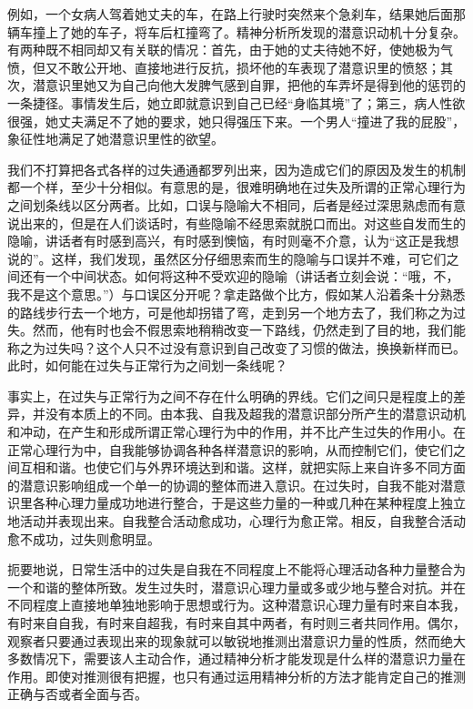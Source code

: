 \documentclass[UTF8,10pt,a4paper,openany]{book}
\begin{document}
例如，一个女病人驾着她丈夫的车，在路上行驶时突然来个急刹车，结果她后面那辆车撞上了她的车子，将车后杠撞弯了。精神分析所发现的潜意识动机十分复杂。有两种既不相同却又有关联的情况：首先，由于她的丈夫待她不好，使她极为气愤，但又不敢公开地、直接地进行反抗，损坏他的车表现了潜意识里的愤怒；其次，潜意识里她又为自己向他大发脾气感到自罪，把他的车弄坏是得到他的惩罚的一条捷径。事情发生后，她立即就意识到自己已经“身临其境”了；第三，病人性欲很强，她丈夫满足不了她的要求，她只得强压下来。一个男人“撞进了我的屁股”，象征性地满足了她潜意识里性的欲望。

我们不打算把各式各样的过失通通都罗列出来，因为造成它们的原因及发生的机制都一个样，至少十分相似。有意思的是，很难明确地在过失及所谓的正常心理行为之间划条线以区分两者。比如，口误与隐喻大不相同，后者是经过深思熟虑而有意说出来的，但是在人们谈话时，有些隐喻不经思索就脱口而出。对这些自发而生的隐喻，讲话者有时感到高兴，有时感到懊恼，有时则毫不介意，认为“这正是我想说的”。这样，我们发现，虽然区分仔细思索而生的隐喻与口误并不难，可它们之间还有一个中间状态。如何将这种不受欢迎的隐喻（讲话者立刻会说：“哦，不，我不是这个意思。”）与口误区分开呢？拿走路做个比方，假如某人沿着条十分熟悉的路线步行去一个地方，可是他却拐错了弯，走到另一个地方去了，我们称之为过失。然而，他有时也会不假思索地稍稍改变一下路线，仍然走到了目的地，我们能称之为过失吗？这个人只不过没有意识到自己改变了习惯的做法，换换新样而已。此时，如何能在过失与正常行为之间划一条线呢？

事实上，在过失与正常行为之间不存在什么明确的界线。它们之间只是程度上的差异，并没有本质上的不同。由本我、自我及超我的潜意识部分所产生的潜意识动机和冲动，在产生和形成所谓正常心理行为中的作用，并不比产生过失的作用小。在正常心理行为中，自我能够协调各种各样潜意识的影响，从而控制它们，使它们之间互相和谐。也使它们与外界环境达到和谐。这样，就把实际上来自许多不同方面的潜意识影响组成一个单一的协调的整体而进入意识。在过失时，自我不能对潜意识里各种心理力量成功地进行整合，于是这些力量的一种或几种在某种程度上独立地活动并表现出来。自我整合活动愈成功，心理行为愈正常。相反，自我整合活动愈不成功，过失则愈明显。

扼要地说，日常生活中的过失是自我在不同程度上不能将心理活动各种力量整合为一个和谐的整体所致。发生过失时，潜意识心理力量或多或少地与整合对抗。并在不同程度上直接地单独地影响于思想或行为。这种潜意识心理力量有时来自本我，有时来自自我，有时来自超我，有时来自其中两者，有时则三者共同作用。偶尔，观察者只要通过表现出来的现象就可以敏锐地推测出潜意识力量的性质，然而绝大多数情况下，需要该人主动合作，通过精神分析才能发现是什么样的潜意识力量在作用。即使对推测很有把握，也只有通过运用精神分析的方法才能肯定自己的推测正确与否或者全面与否。
\end{document}
